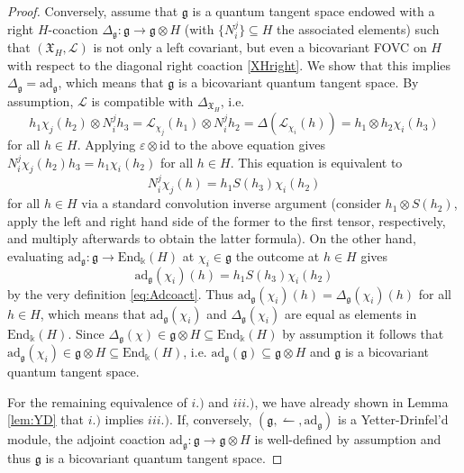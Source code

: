 \documentclass{article}
\theoremstyle{definition}
\begin{document}
\begin{proof}
		Conversely, assume that $\mathfrak{g}$ is a quantum tangent space endowed with a right $H$-coaction $\Delta_\mathfrak{g}\colon\mathfrak{g}\to\mathfrak{g}\otimes H$ (with $\{N_i^j\}\subseteq H$ the associated elements) such that $(\mathfrak{X}_H,\mathscr{L})$ is not only a left covariant, but even a bicovariant FOVC on $H$ with respect to the diagonal right coaction \eqref{XHright}. We show that this implies $\Delta_\mathfrak{g}=\mathrm{ad}_\mathfrak{g}$, which means that $\mathfrak{g}$ is a bicovariant quantum tangent space. By assumption, $\mathscr{L}$ is compatible with $\Delta_{\mathfrak{X}_H}$, i.e.
		$$
		h_1\chi_j(h_2)\otimes N_i^jh_3
		=\mathscr{L}_{\chi_j}(h_1)\otimes N_i^jh_2
		=\Delta(\mathscr{L}_{\chi_i}(h))
		=h_1\otimes h_2\chi_i(h_3)
		$$
		for all $h\in H$. Applying $\varepsilon\otimes\mathrm{id}$ to the above equation gives
		$
		N_i^j\chi_j(h_2)h_3=h_1\chi_i(h_2)
		$
		for all $h\in H$. This equation is equivalent to
		$$
		N_i^j\chi_j(h)=h_1S(h_3)\chi_i(h_2)
		$$
		for all $h\in H$ via a standard convolution inverse argument (consider $h_1\otimes S(h_2)$, apply the left and right hand side of the former to the first tensor, respectively, and multiply afterwards to obtain the latter formula). On the other hand, evaluating $\mathrm{ad}_\mathfrak{g}\colon\mathfrak{g}\to\mathrm{End}_\Bbbk(H)$ at $\chi_i\in\mathfrak{g}$ the outcome at $h\in H$ gives
		$$
		\mathrm{ad}_\mathfrak{g}(\chi_i)(h)
		=h_1S(h_3)\chi_i(h_2)
		$$
		by the very definition \eqref{eq:Adcoact}. Thus $\mathrm{ad}_\mathfrak{g}(\chi_i)(h)=\Delta_\mathfrak{g}(\chi_i)(h)$ for all $h\in H$, which means that $\mathrm{ad}_\mathfrak{g}(\chi_i)$ and $\Delta_\mathfrak{g}(\chi_i)$ are equal as elements in $\mathrm{End}_\Bbbk(H)$. Since $\Delta_\mathfrak{g}(\chi)\in\mathfrak{g}\otimes H\subseteq\mathrm{End}_\Bbbk(H)$ by assumption it follows that $\mathrm{ad}_\mathfrak{g}(\chi_i)\in\mathfrak{g}\otimes H\subseteq\mathrm{End}_\Bbbk(H)$, i.e. $\mathrm{ad}_\mathfrak{g}(\mathfrak{g})\subseteq\mathfrak{g}\otimes H$ and $\mathfrak{g}$ is a bicovariant quantum tangent space.
		
		For the remaining equivalence of $i.)$ and $iii.)$, we have already shown in Lemma \ref{lem:YD} that $i.)$ implies $iii.)$. If, conversely, $(\mathfrak{g},\leftharpoonup,\mathrm{ad}_\mathfrak{g})$ is a Yetter-Drinfel'd module, the adjoint coaction $\mathrm{ad}_\mathfrak{g}\colon\mathfrak{g}\to\mathfrak{g}\otimes H$ is well-defined by assumption and thus $\mathfrak{g}$ is a bicovariant quantum tangent space.
	\end{proof}
	
\end{document}
